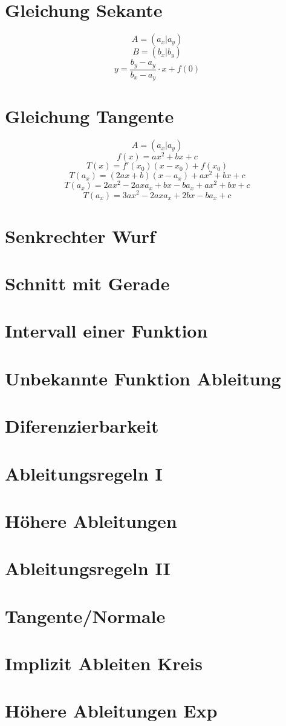 \section{Gleichung Sekante}
\[ A = (a_x | a_y) \]
\[ B = (b_x | b_y) \]
\[ y = \frac{b_y - a_y}{b_x - a_y} \cdot x + f(0) \]

\section{Gleichung Tangente}
\[ A = (a_x | a_y) \]
\[ f(x) = a x^2 + b x + c \]
\[ T(x) = f'(x_0)(x - x_0) + f(x_0) \]
\[ T(a_x) = (2 a x + b)(x - a_x) + a x^2 + b x + c \]
\[ T(a_x) = 2 a x^2 - 2 a x a_x + b x - b a_x + a x^2 + b x + c \]
\[ T(a_x) = 3 a x^2 - 2 a x a_x + 2 b x - b a_x + c \]

\section{Senkrechter Wurf}


\section{Schnitt mit Gerade}


\section{Intervall einer Funktion}


\section{Unbekannte Funktion Ableitung}


\section{Diferenzierbarkeit}


\section{Ableitungsregeln I}


\section{Höhere Ableitungen}


\section{Ableitungsregeln II}


\section{Tangente/Normale}


\section{Implizit Ableiten Kreis}


\section{Höhere Ableitungen Exp}

